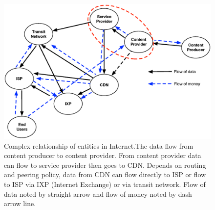 \documentclass[paper]{ieice}
\begin{document}
\begin{figure}[tb]
\begin{center}
\includegraphics[scale=0.35]{graphs/business-relationship.eps}
\end{center}
\caption{Complex relationship of entities in Internet.The data flow from content producer to content provider. From content provider data can flow to service provider then goes to CDN. Depends on routing and peering policy, data from CDN can flow directly to ISP or flow to ISP via IXP (Internet Exchange) or via transit network. Flow of data noted by straight arrow and flow of money noted by dash arrow line.}
\label{fig:businessrelationship}
\vspace{-2mm}
\end{figure} 



\end{document}
